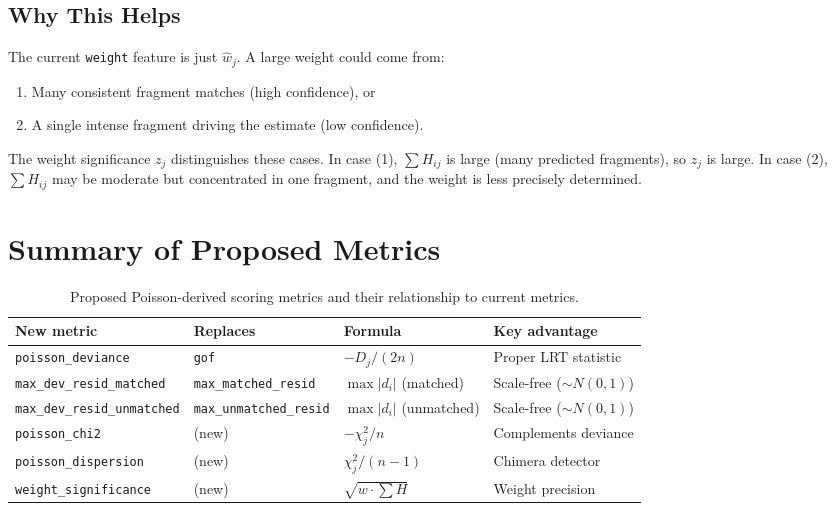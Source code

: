 \documentclass[11pt,a4paper]{article}
\begin{document}
\subsection{Why This Helps}

The current \texttt{weight} feature is just $\hat{w}_j$. A large weight could come from:
\begin{enumerate}[]
    \item Many consistent fragment matches (high confidence), or
    \item A single intense fragment driving the estimate (low confidence).
\end{enumerate}
The weight significance $z_j$ distinguishes these cases. In case (1),
$\sum H_{ij}$ is large (many predicted fragments), so $z_j$ is large. In case (2),
$\sum H_{ij}$ may be moderate but concentrated in one fragment, and the weight is less
precisely determined.

\section{Summary of Proposed Metrics}
\label{sec:summary}

\begin{table}[h]
\centering
\caption{Proposed Poisson-derived scoring metrics and their relationship to current metrics.}
\label{tab:metrics}
\begin{tabular}{@{}llll@{}}
\toprule
\textbf{New metric} & \textbf{Replaces} & \textbf{Formula} & \textbf{Key advantage} \\
\midrule
\texttt{poisson\_deviance} & \texttt{gof} &
    $-D_j / (2n)$ &
    Proper LRT statistic \\
\texttt{max\_dev\_resid\_matched} & \texttt{max\_matched\_resid} &
    $\max|d_i|$ (matched) &
    Scale-free ($\sim N(0,1)$) \\
\texttt{max\_dev\_resid\_unmatched} & \texttt{max\_unmatched\_resid} &
    $\max|d_i|$ (unmatched) &
    Scale-free ($\sim N(0,1)$) \\
\texttt{poisson\_chi2} & (new) &
    $-\chi^2_j / n$ &
    Complements deviance \\
\texttt{poisson\_dispersion} & (new) &
    $\chi^2_j / (n-1)$ &
    Chimera detector \\
\texttt{weight\_significance} & (new) &
    $\sqrt{w \cdot \sum H}$ &
    Weight precision \\
\bottomrule
\end{tabular}
\end{table}
\end{document}

